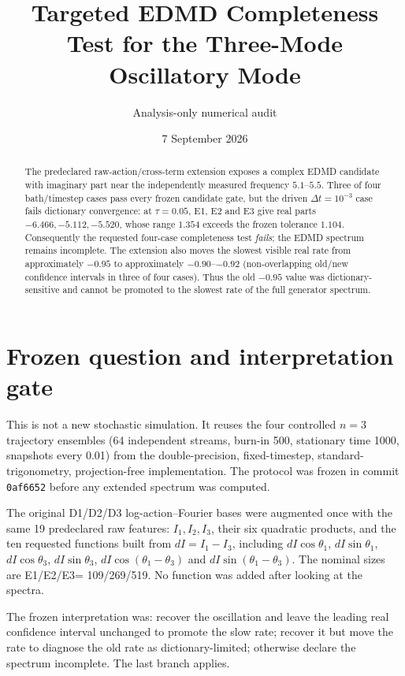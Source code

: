 \documentclass[11pt]{article}
\title{Targeted EDMD Completeness Test for the Three-Mode Oscillatory Mode}
\author{Analysis-only numerical audit}
\date{7 September 2026}
\newcommand{\dt}{\Delta t}
\begin{document}
\maketitle

\begin{abstract}
The predeclared raw-action/cross-term extension exposes a complex EDMD
candidate with imaginary part near the independently measured frequency
$5.1$--$5.5$. Three of four bath/timestep cases pass every frozen candidate
gate, but the driven $\dt=10^{-3}$ case fails dictionary convergence: at
$\tau=0.05$, E1, E2 and E3 give real parts $-6.466,-5.112,-5.520$, whose
range $1.354$ exceeds the frozen tolerance $1.104$. Consequently the requested
four-case completeness test \emph{fails}; the EDMD spectrum remains incomplete.
The extension also moves the slowest visible real rate from approximately
$-0.95$ to approximately $-0.90$--$-0.92$ (non-overlapping old/new confidence
intervals in three of four cases). Thus the old $-0.95$ value was
dictionary-sensitive and cannot be promoted to the slowest rate of the full
generator spectrum.
\end{abstract}

\section{Frozen question and interpretation gate}

This is not a new stochastic simulation. It reuses the four controlled
$n=3$ trajectory ensembles (64 independent streams, burn-in 500, stationary
time 1000, snapshots every 0.01) from the double-precision, fixed-timestep,
standard-trigonometry, projection-free implementation. The protocol was
frozen in commit \texttt{0af6652} before any extended spectrum was computed.

The original D1/D2/D3 log-action--Fourier bases were augmented once with the
same 19 predeclared raw features: $I_1,I_2,I_3$, their six quadratic products,
and the ten requested functions built from $dI=I_1-I_3$, including
$dI\cos\theta_1$, $dI\sin\theta_1$, $dI\cos\theta_3$,
$dI\sin\theta_3$, $dI\cos(\theta_1-\theta_3)$ and
$dI\sin(\theta_1-\theta_3)$. The nominal sizes are E1/E2/E3=
109/269/519. No function was added after looking at the spectra.

The frozen interpretation was: recover the oscillation and leave the leading
real confidence interval unchanged to promote the slow rate; recover it but
move the rate to diagnose the old rate as dictionary-limited; otherwise declare
the spectrum incomplete. The last branch applies.
\end{document}
